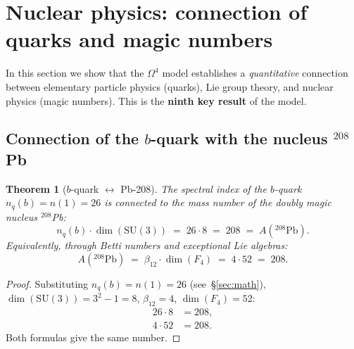 \documentclass[11pt,a4paper]{article}
\newcommand{\SU}{\ensuremath{\mathrm{SU}}}
\newcommand{\Om}{\ensuremath{\Omega^4}}
\newtheorem{theorem}{Theorem}[section]
\theoremstyle{definition}
\begin{document}
\section{Nuclear physics: connection of quarks and magic numbers}
\label{sec:nuclear}

In this section we show that the $\Om$ model establishes
a \emph{quantitative} connection between elementary particle physics
(quarks), Lie group theory, and nuclear physics (magic numbers).
This is the \textbf{ninth key result} of the model.

\subsection{Connection of the \texorpdfstring{$b$}{b}-quark with the nucleus \texorpdfstring{$^{208}$Pb}{208Pb}}
\label{subsec:b-quark-pb208}

\begin{theorem}[$b$-quark $\leftrightarrow$ Pb-208]
\label{thm:b-quark-pb}
The spectral index of the $b$-quark $n_q(b) = n(1) = 26$
is connected to the mass number of the doubly magic nucleus $^{208}$Pb:
\begin{equation}
    \boxed{
    n_q(b) \cdot \dim(\SU(3)) \;=\; 26 \cdot 8 \;=\; 208 \;=\; A(^{208}\text{Pb}).
    }
    \label{eq:b-quark-pb208}
\end{equation}
Equivalently, through Betti numbers and exceptional Lie algebras:
\begin{equation}
    A(^{208}\text{Pb}) \;=\; \beta_{12} \cdot \dim(F_4) \;=\; 4 \cdot 52 \;=\; 208.
    \label{eq:pb208-alt}
\end{equation}
\end{theorem}

\begin{proof}
Substituting $n_q(b) = n(1) = 26$ (see~\S\ref{sec:math}),
$\dim(\SU(3)) = 3^2 - 1 = 8$, $\beta_{12} = 4$,
$\dim(F_4) = 52$:
\begin{align}
    26 \cdot 8 &= 208, \\
    4 \cdot 52 &= 208.
\end{align}
Both formulas give the same number.
\end{proof}
\end{document}
